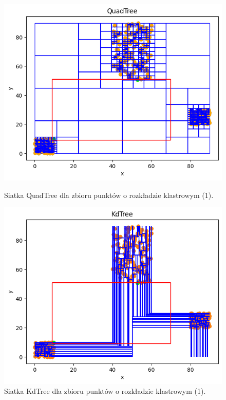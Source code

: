 \documentclass{lab}
\begin{document}
\begin{figure}[H]
  \centering
  \begin{minipage}{0.495\textwidth}
      \centering
      \includegraphics[width=1\textwidth]{resources/cluster_QuadTree_1.png}
      \caption{Siatka QuadTree dla zbioru punktów o rozkładzie klastrowym (1).}
      \label{fig:cluster_QuadTree_1}
  \end{minipage}
  \begin{minipage}{0.495\textwidth}
      \centering
      \includegraphics[width=1\textwidth]{resources/cluster_KdTree_1.png}
      \caption{Siatka KdTree dla zbioru punktów o rozkładzie klastrowym (1).}
      \label{fig:cluster_KdTree_1}
  \end{minipage}
\end{figure}
\end{document}
